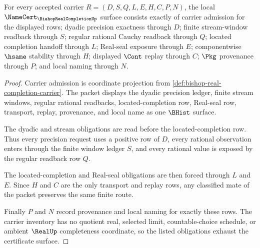 \begin{theorem}
\label{thm:bishop-real-completion-namecert-obligations}
For every accepted carrier $R=(D,S,Q,L,E,H,C,P,N)$, the local $\NameCert_{\BishopRealCompletionUp}$ surface consists exactly of carrier admission for the displayed rows; dyadic precision exactness through $D$; finite stream-window readback through $S$; regular rational Cauchy readback through $Q$; located completion handoff through $L$; Real-seal exposure through $E$; componentwise $\hsame$ stability through $H$; displayed $\Cont$ replay through $C$; $\Pkg$ provenance through $P$; and local naming through $N$.
\end{theorem}
\begin{proof}
Carrier admission is coordinate projection from \autoref{def:bishop-real-completion-carrier}. The packet displays the dyadic precision ledger, finite stream windows, regular rational readbacks, located-completion row, Real-seal row, transport, replay, provenance, and local name as one $\BHist$ surface.

The dyadic and stream obligations are read before the located-completion row. Thus every precision request uses a positive row of $D$, every rational observation enters through the finite window ledger $S$, and every rational value is exposed by the regular readback row $Q$.

The located-completion and Real-seal obligations are then forced through $L$ and $E$. Since $H$ and $C$ are the only transport and replay rows, any classified mate of the packet preserves the same finite route.

Finally $P$ and $N$ record provenance and local naming for exactly these rows. The carrier inventory has no quotient real, selected limit, countable-choice schedule, or ambient $\RealUp$ completeness coordinate, so the listed obligations exhaust the certificate surface.
\end{proof}

